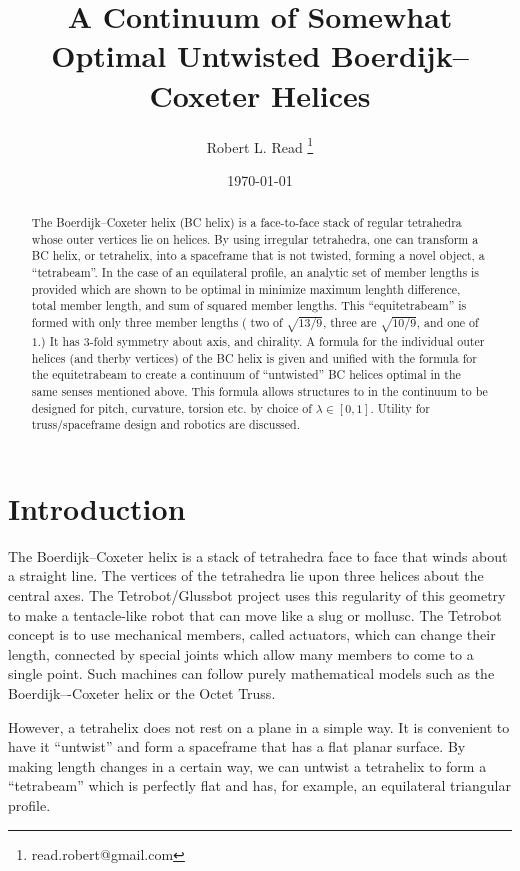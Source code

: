 \documentclass[11pt]{article}
\title{A Continuum of Somewhat Optimal Untwisted Boerdijk--Coxeter Helices}
\author{Robert L. Read
  \thanks{read.robert@gmail.com}
}
\affil{Founder, Public Invention, an educational non-profit.}
\date{\today}
\begin{document}
\maketitle


\begin{abstract}
  The Boerdijk--Coxeter helix (BC helix) is a face-to-face stack of regular tetrahedra whose outer vertices lie on helices.
  By using irregular tetrahedra, one can transform a BC helix, or tetrahelix, into a spaceframe that is not twisted, forming a novel object, a
  ``tetrabeam''.
  In the case of an equilateral profile, an analytic set of member lengths is provided which are shown to be optimal in minimize
  maximum lenghth difference, total member length, and sum of squared member lengths.
  This ``equitetrabeam'' is formed with only three member lengths ( two of $\sqrt{13/9}$, three are $\sqrt{10/9}$, and one of $1$.)
  It has 3-fold symmetry about  axis, and chirality.  
  A formula for the individual outer helices (and therby vertices) of the BC helix is given and
  unified with the formula for the equitetrabeam to create a continuum of ``untwisted'' BC helices optimal
  in the same senses mentioned above. This formula allows structures to in the continuum to be
  designed for pitch, curvature, torsion etc. by choice of $\lambda \in [0,1]$. Utility for truss/spaceframe design and
  robotics are discussed.
\end{abstract}


\section{Introduction}

The Boerdijk--Coxeter helix is a stack of tetrahedra face to face that winds about a straight line. The vertices of the tetrahedra
lie upon three
helices about the central axes. The Tetrobot/Glussbot project
uses this regularity of this geometry to make a tentacle-like robot that can move like a slug or mollusc. The Tetrobot concept
is to use mechanical members, called actuators, which can change their length, connected by special joints which allow many
members to come to a single point. Such machines can follow purely mathematical models such as the Boerdijk–-Coxeter helix or the Octet Truss.

However, a tetrahelix does not rest on a plane in a simple way. It is convenient to have it ``untwist'' and form a spaceframe that
has a flat planar surface. By making length changes in a certain way, we can untwist a tetrahelix to form a ``tetrabeam'' which
is perfectly flat and has, for example, an equilateral triangular profile.
\end{document}
